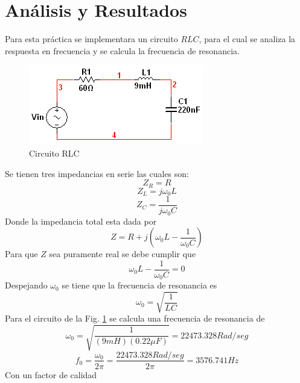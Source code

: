 \documentclass[twocolumn]{IEEEtran}
\begin{document}
\section{Análisis y Resultados}
\noindent
Para esta práctica se implementara un circuito $RLC$, para el cual se analiza la respuesta en frecuencia y se calcula la frecuencia de resonancia.
\begin{figure}[H]
	\centering
		\includegraphics[scale=0.8]{circ1.PNG}
	\caption{Circuito RLC}
	\label{circ1}
\end{figure}
\noindent
Se tienen tres impedancias en serie las cuales son:
\begin{equation}
Z_R=R
\label{ecuR}
\end{equation}
\begin{equation}
Z_L=j \omega_0 L
\label{ecuL}
\end{equation}
\begin{equation}
Z_C =  \frac{1}{j\omega_0 C}
\label{ecuC}
\end{equation}
\noindent
Donde la impedancia total esta dada por
\begin{equation}
Z= R + j(\omega_0 L - \frac{1}{\omega_0 C})
\label{ecu101}
\end{equation}
\noindent
Para que $Z$ sea puramente real se debe cumplir que
\begin{equation}
\omega_0 L - \frac{1}{\omega_0 C}=0
\label{ecu102}
\end{equation}
\noindent
Despejando $\omega_0$ se tiene que la frecuencia de resonancia es
\begin{equation}
\omega_0=\sqrt{\frac{1}{LC}}
\label{ecu103}
\end{equation}
\noindent
Para el circuito de la Fig. \ref{circ1} se calcula una frecuencia de resonancia de
\begin{equation}
\omega_0=\sqrt{\frac{1}{(9mH)(0.22\mu F)}}=22473.328 Rad/seg
\label{ecu104}
\end{equation}
\noindent
\begin{equation}
f_0=\frac{\omega_0}{2 \pi}=\frac{22473.328Rad/seg}{2 \pi}=3576.741 Hz
\label{ecu104}
\end{equation}
\noindent
Con un factor de calidad
\end{document}
